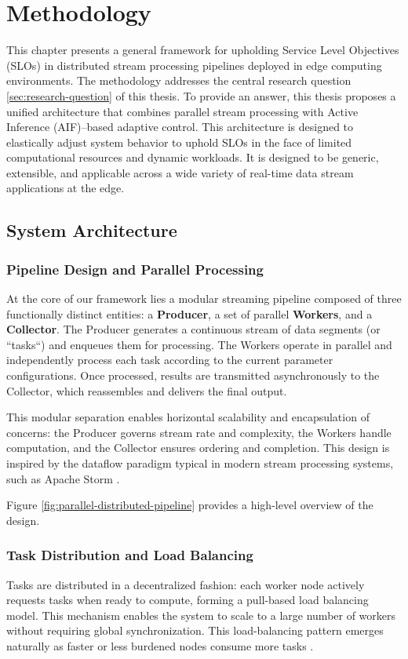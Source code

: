 \chapter{Methodology}
This chapter presents a general framework for upholding Service Level Objectives (SLOs) in distributed stream processing pipelines deployed in edge computing environments. The methodology addresses the central research question \ref{sec:research-question} of this thesis. To provide an answer, this thesis proposes a unified architecture that combines parallel stream processing with Active Inference (AIF)–based adaptive control. This architecture is designed to elastically adjust system behavior to uphold SLOs in the face of limited computational resources and dynamic workloads. It is designed to be generic, extensible, and applicable across a wide variety of real-time data stream applications at the edge.

\section{System Architecture}
\subsection{Pipeline Design and Parallel Processing}
At the core of our framework lies a modular streaming pipeline composed of three functionally distinct entities: a\textbf{ Producer}, a set of parallel \textbf{Workers}, and a \textbf{
Collector}. The Producer generates a continuous stream of data segments (or ``tasks``) and enqueues them for processing. The Workers operate in parallel and independently process each task according to the current parameter configurations. Once processed, results are transmitted asynchronously to the Collector, which reassembles and delivers the final output.

This modular separation enables horizontal scalability and encapsulation of concerns: the Producer governs stream rate and complexity, the Workers handle computation, and the Collector ensures ordering and completion. This design is inspired by the dataflow paradigm typical in modern stream processing systems, such as Apache Storm \cite{carbone_apache_2015, noauthor_apache_nodate}. 

Figure \ref{fig:parallel-distributed-pipeline} provides a high-level overview of the design.

\subsection{Task Distribution and Load Balancing}
Tasks are distributed in a decentralized fashion: each worker node actively requests tasks when ready to compute, forming a pull-based load balancing model. This mechanism enables the system to scale to a large number of workers without requiring global synchronization. This load-balancing pattern emerges naturally as faster or less burdened nodes consume more tasks \cite{estrada_comparing_2015}.

